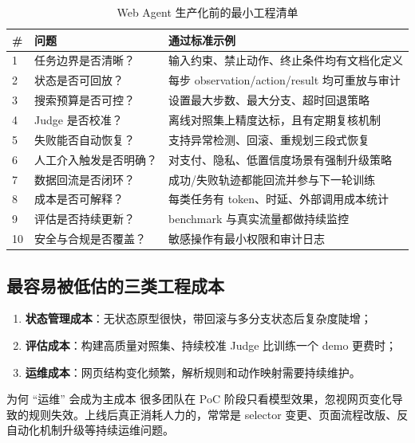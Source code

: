 \documentclass[a4paper]{article}
\begin{document}
\begin{table}[H]
\centering
\small
\begin{tabular}{p{0.8cm}p{3.9cm}p{5.8cm}}
\toprule
\textbf{\#} & \textbf{问题} & \textbf{通过标准示例} \\
\midrule
1 & 任务边界是否清晰？ & 输入约束、禁止动作、终止条件均有文档化定义 \\
2 & 状态是否可回放？ & 每步 observation/action/result 均可重放与审计 \\
3 & 搜索预算是否可控？ & 设置最大步数、最大分支、超时回退策略 \\
4 & Judge 是否校准？ & 离线对照集上精度达标，且有定期复核机制 \\
5 & 失败能否自动恢复？ & 支持异常检测、回滚、重规划三段式恢复 \\
6 & 人工介入触发是否明确？ & 对支付、隐私、低置信度场景有强制升级策略 \\
7 & 数据回流是否闭环？ & 成功/失败轨迹都能回流并参与下一轮训练 \\
8 & 成本是否可解释？ & 每类任务有 token、时延、外部调用成本统计 \\
9 & 评估是否持续更新？ & benchmark 与真实流量都做持续监控 \\
10 & 安全与合规是否覆盖？ & 敏感操作有最小权限和审计日志 \\
\bottomrule
\end{tabular}
\caption{Web Agent 生产化前的最小工程清单}
\end{table}

\subsection{最容易被低估的三类工程成本}
\begin{enumerate}
    \item \textbf{状态管理成本}：无状态原型很快，带回滚与多分支状态后复杂度陡增；
    \item \textbf{评估成本}：构建高质量对照集、持续校准 Judge 比训练一个 demo 更费时；
    \item \textbf{运维成本}：网页结构变化频繁，解析规则和动作映射需要持续维护。
\end{enumerate}

\begin{knowledgebox}{为何 ``运维'' 会成为主成本}
很多团队在 PoC 阶段只看模型效果，忽视网页变化导致的规则失效。上线后真正消耗人力的，常常是 selector 变更、页面流程改版、反自动化机制升级等持续运维问题。
\end{knowledgebox}
\end{document}
